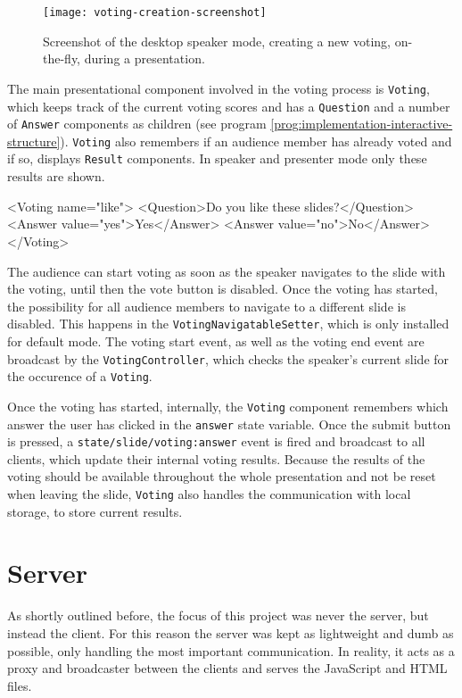 \begin{figure}
\centering
\texttt{[image: voting-creation-screenshot]}
\caption{Screenshot of the desktop speaker mode, creating a new voting, on-the-fly, during a presentation.}
\label{fig:implementation-interactive-voting}
\end{figure}

The main presentational component involved in the voting process is \texttt{Voting}, which keeps track of the current voting scores and has a \texttt{Question} and a number of \texttt{Answer} components as children (see program \ref{prog:implementation-interactive-structure}). \texttt{Voting} also remembers if an audience member has already voted and if so, displays \texttt{Result} components. In speaker and presenter mode only these results are shown.

\begin{program}
\caption{Example code for preparing a slide with voting.}
\label{prog:implementation-interactive-structure}
\begin{JsCode}
<Voting name="like">
  <Question>Do you like these slides?</Question>
  <Answer value="yes">Yes</Answer>
  <Answer value="no">No</Answer>
</Voting>
\end{JsCode}
\end{program}

The audience can start voting as soon as the speaker navigates to the slide with the voting, until then the vote button is disabled. Once the voting has started, the possibility for all audience members to navigate to a different slide is disabled. This happens in the \texttt{VotingNavigatableSetter}, which is only installed for default mode. The voting start event, as well as the voting end event are broadcast by the \texttt{VotingController}, which checks the speaker's current slide for the occurence of a \texttt{Voting}.

Once the voting has started, internally, the \texttt{Voting} component remembers which answer the user has clicked in the \texttt{answer} state variable. Once the submit button is pressed, a \texttt{state/slide/voting:answer} event is fired and broadcast to all clients, which update their internal voting results.
Because the results of the voting should be available throughout the whole presentation and not be reset when leaving the slide, \texttt{Voting} also handles the communication with local storage, to store current results.

\section{Server}
\label{sec:implementation-server}
As shortly outlined before, the focus of this project was never the server, but instead the client. For this reason the server was kept as lightweight and dumb as possible, only handling the most important communication. In reality, it acts as a proxy and broadcaster between the clients and serves the JavaScript and HTML files.

